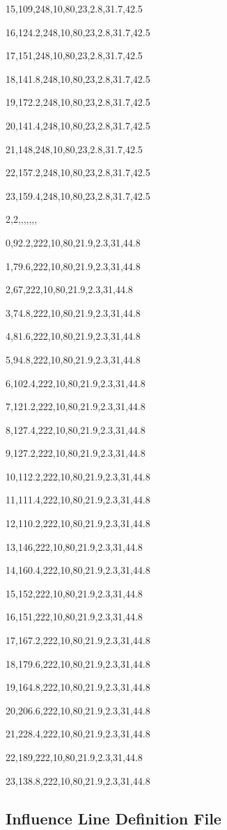 \documentclass[
]{article}
\begin{document}
15,109,248,10,80,23,2.8,31.7,42.5

16,124.2,248,10,80,23,2.8,31.7,42.5

17,151,248,10,80,23,2.8,31.7,42.5

18,141.8,248,10,80,23,2.8,31.7,42.5

19,172.2,248,10,80,23,2.8,31.7,42.5

20,141.4,248,10,80,23,2.8,31.7,42.5

21,148,248,10,80,23,2.8,31.7,42.5

22,157.2,248,10,80,23,2.8,31.7,42.5

23,159.4,248,10,80,23,2.8,31.7,42.5

2,2,,,,,,,

0,92.2,222,10,80,21.9,2.3,31,44.8

1,79.6,222,10,80,21.9,2.3,31,44.8

2,67,222,10,80,21.9,2.3,31,44.8

3,74.8,222,10,80,21.9,2.3,31,44.8

4,81.6,222,10,80,21.9,2.3,31,44.8

5,94.8,222,10,80,21.9,2.3,31,44.8

6,102.4,222,10,80,21.9,2.3,31,44.8

7,121.2,222,10,80,21.9,2.3,31,44.8

8,127.4,222,10,80,21.9,2.3,31,44.8

9,127.2,222,10,80,21.9,2.3,31,44.8

10,112.2,222,10,80,21.9,2.3,31,44.8

11,111.4,222,10,80,21.9,2.3,31,44.8

12,110.2,222,10,80,21.9,2.3,31,44.8

13,146,222,10,80,21.9,2.3,31,44.8

14,160.4,222,10,80,21.9,2.3,31,44.8

15,152,222,10,80,21.9,2.3,31,44.8

16,151,222,10,80,21.9,2.3,31,44.8

17,167.2,222,10,80,21.9,2.3,31,44.8

18,179.6,222,10,80,21.9,2.3,31,44.8

19,164.8,222,10,80,21.9,2.3,31,44.8

20,206.6,222,10,80,21.9,2.3,31,44.8

21,228.4,222,10,80,21.9,2.3,31,44.8

22,189,222,10,80,21.9,2.3,31,44.8

23,138.8,222,10,80,21.9,2.3,31,44.8

\subsection{Influence Line Definition
File}\label{influence-line-definition-file}
\end{document}
